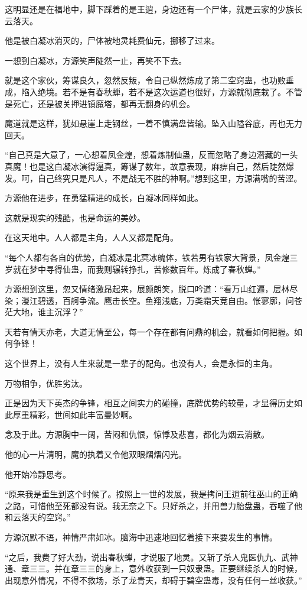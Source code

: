 \begin{this_body}
这明显还是在福地中，脚下踩着的是王逍，身边还有一个尸体，就是云家的少族长云落天。

他是被白凝冰消灭的，尸体被地灵耗费仙元，挪移了过来。

一想到白凝冰，方源笑声陡然一止，再笑不下去。

就是这个家伙，筹谋良久，忽然反叛，令自己纵然炼成了第二空窍蛊，也功败垂成，陷入绝境。若不是有春秋蝉，若不是这次运道也很好，方源就彻底栽了。不管是死亡，还是被关押进镇魔塔，都再无翻身的机会。

魔道就是这样，犹如悬崖上走钢丝，一着不慎满盘皆输。坠入山隘谷底，再也无力回天。

“自己真是大意了，一心想着凤金煌，想着炼制仙蛊，反而忽略了身边潜藏的一头真魔！也是这白凝冰演得逼真，筹谋了数年，故意表现，麻痹自己，然后陡然爆发。呵，自己终究只是凡人，不是战无不胜的神啊。”想到这里，方源满嘴的苦涩。

方源他在进步，在勇猛精进的成长，白凝冰同样如此。

这就是现实的残酷，也是命运的美妙。

在这天地中。人人都是主角，人人又都是配角。

“每个人都有各自的优势，白凝冰是北冥冰魄体，铁若男有铁家大背景，凤金煌三岁就在梦中寻得仙蛊，而我则辗转挣扎，苦修数百年。炼成了春秋蝉。”

方源想到这里，忽又情绪激昂起来，展颜朗笑，脱口吟道：“看万山红遍，层林尽染；漫江碧透，百舸争流。鹰击长空。鱼翔浅底，万类霜天竞自由。怅寥廓，问苍茫大地，谁主沉浮？”

天若有情天亦老，大道无情至公，每一个存在都有问鼎的机会，就看如何把握。如何争锋！

这个世界上，没有人生来就是一辈子的配角。也没有人，会是永恒的主角。

万物相争，优胜劣汰。

正是因为天下英杰的争锋，相互之间实力的碰撞，底牌优势的较量，才显得历史如此厚重精彩，世间如此丰富曼妙啊。

念及于此。方源胸中一阔，苦闷和仇恨，惊悸及悲喜，都化为烟云消散。

他的心一片清明，魔的执着又令他双眼熠熠闪光。

他开始冷静思考。

“原来我是重生到这个时候了。按照上一世的发展，我是拷问王逍前往巫山的正确之路，可惜他至死都没有说。我无奈之下。只好杀之，并用兽力胎盘蛊，吞噬了他和云落天的空窍。”

方源沉默不语，神情严肃如冰。脑海中迅速地回忆着接下来要发生的事情。

“之后，我费了好大劲，说出春秋蝉，才说服了地灵。又斩了杀人鬼医仇九、武神通、章三三。并在章三三的身上，意外收获到一只奴隶蛊。正要继续杀人的时候，出现意外情况，不得不救场，杀了龙青天，却碍于碧空蛊毒，没有任何一丝收获。”


\end{this_body}
